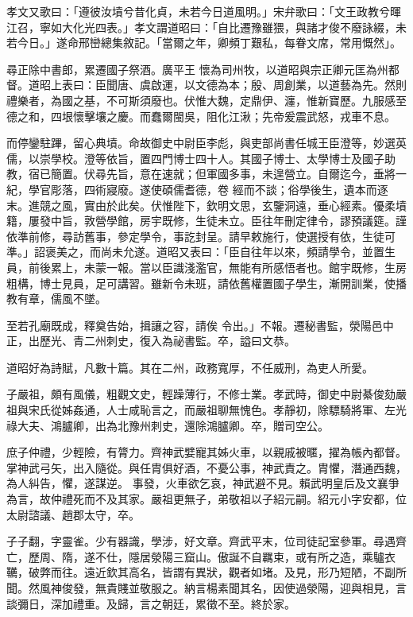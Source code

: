 \begin{pinyinscope}
 孝文又歌曰：「遵彼汝墳兮昔化貞，未若今日道風明。」宋弁歌曰：「文王政教兮暉江召，寧如大化光四表。」孝文謂道昭曰：「自比遷豫雖猥，與諸才俊不廢詠綴，未若今日。」遂命邢巒總集敘記。「當爾之年，卿頻丁艱私，每眷文席，常用慨然」。



 尋正除中書郎，累遷國子祭酒。廣平王
 懷為司州牧，以道昭與宗正卿元匡為州都督。道昭上表曰：臣聞唐、虞啟運，以文德為本；殷、周創業，以道藝為先。然則禮樂者，為國之基，不可斯須廢也。伏惟大魏，定鼎伊、瀍，惟新寶歷。九服感至德之和，四垠懷擊壤之慶。而蠢爾閩吳，阻化江湫；先帝爰震武怒，戎車不息。



 而停鑾駐蹕，留心典墳。命故御史中尉臣李彪，與吏部尚書任城王臣澄等，妙選英儒，以崇學校。澄等依旨，置四門博士四十人。其國子博士、太學博士及國子助教，宿已簡置。伏尋先旨，意在速就；但軍國多事，未遑營立。自爾迄今，垂將一紀，學官彫落，四術寢廢。遂使碩儒耆德，卷
 經而不談；俗學後生，遺本而逐末。進競之風，實由於此矣。伏惟陛下，欽明文思，玄鑒洞遠，垂心經素。優柔墳籍，屢發中旨，敦營學館，房宇既修，生徒未立。臣往年刪定律令，謬預議筵。謹依準前修，尋訪舊事，參定學令，事訖封呈。請早敕施行，使選授有依，生徒可準。」詔褒美之，而尚未允遂。道昭又表曰：「臣自往年以來，頻請學令，並置生員，前後累上，未蒙一報。當以臣識淺濫官，無能有所感悟者也。館宇既修，生房粗構，博士見員，足可講習。雖新令未班，請依舊權置國子學生，漸開訓業，使播教有章，儒風不墜。



 至若孔廟既成，釋奠告始，揖讓之容，請俟
 令出。」不報。遷秘書監，滎陽邑中正，出歷光、青二州刺史，復入為祕書監。卒，謚曰文恭。



 道昭好為詩賦，凡數十篇。其在二州，政務寬厚，不任威刑，為吏人所愛。



 子嚴祖，頗有風儀，粗觀文史，輕躁薄行，不修士業。孝武時，御史中尉綦俊劾嚴祖與宋氏從姊姦通，人士咸恥言之，而嚴祖聊無愧色。孝靜初，除驃騎將軍、左光祿大夫、鴻臚卿，出為北豫州刺史，還除鴻臚卿。卒，贈司空公。



 庶子仲禮，少輕險，有膂力。齊神武嬖寵其姊火車，以親戚被暱，擢為帳內都督。掌神武弓矢，出入隨從。與任胄俱好酒，不憂公事，神武責之。胄懼，潛通西魏，為人糾告，懼，遂謀逆。
 事發，火車欲乞哀，神武避不見。賴武明皇后及文襄爭為言，故仲禮死而不及其家。嚴祖更無子，弟敬祖以子紹元嗣。紹元小字安都，位太尉諮議、趙郡太守，卒。



 子子翻，字靈雀。少有器識，學涉，好文章。齊武平末，位司徒記室參軍。尋遇齊亡，歷周、隋，遂不仕，隱居滎陽三窟山。傲誕不自羈束，或有所之造，乘驢衣韉，破弊而往。遠近欽其高名，皆謂有異狀，觀者如堵。及見，形乃短陋，不副所聞。然風神俊發，無貴賤並敬服之。納言楊素聞其名，因使過滎陽，迎與相見，言談彌日，深加禮重。及歸，言之朝廷，累徵不至。終於家。




\end{pinyinscope}
